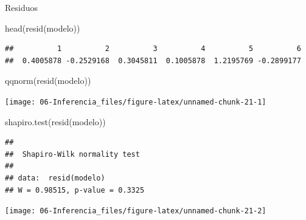 \documentclass[
]{book}
\newenvironment{Shaded}{\begin{snugshade}}{\end{snugshade}}
\newcommand{\CommentTok}[1]{\textcolor[rgb]{0.56,0.35,0.01}{\textit{#1}}}
\newcommand{\FunctionTok}[1]{\textcolor[rgb]{0.00,0.00,0.00}{#1}}
\newcommand{\NormalTok}[1]{#1}
\newcommand{\SpecialCharTok}[1]{\textcolor[rgb]{0.00,0.00,0.00}{#1}}
\theoremstyle{break}
\begin{document}
Residuos

\begin{Shaded}
\begin{Highlighting}[]
\FunctionTok{head}\NormalTok{(}\FunctionTok{resid}\NormalTok{(modelo))}
\end{Highlighting}
\end{Shaded}

\begin{verbatim}
##          1          2          3          4          5          6 
##  0.4005878 -0.2529168  0.3045811  0.1005878  1.2195769 -0.2899177
\end{verbatim}

\begin{Shaded}
\begin{Highlighting}[]
\FunctionTok{qqnorm}\NormalTok{(}\FunctionTok{resid}\NormalTok{(modelo))}
\end{Highlighting}
\end{Shaded}

\begin{center}\texttt{[image: 06-Inferencia\_files/figure-latex/unnamed-chunk-21-1]} \end{center}

\begin{Shaded}
\begin{Highlighting}[]
\FunctionTok{shapiro.test}\NormalTok{(}\FunctionTok{resid}\NormalTok{(modelo))}
\end{Highlighting}
\end{Shaded}

\begin{verbatim}
## 
##  Shapiro-Wilk normality test
## 
## data:  resid(modelo)
## W = 0.98515, p-value = 0.3325
\end{verbatim}

\begin{Shaded}
\end{Shaded}

\begin{center}\texttt{[image: 06-Inferencia\_files/figure-latex/unnamed-chunk-21-2]} \end{center}
\end{document}
